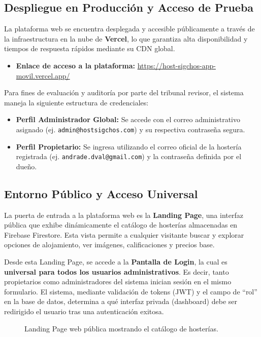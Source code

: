 \documentclass[12pt,letterpaper]{report}
\begin{document}
\subsection{Despliegue en Producción y Acceso de Prueba}
La plataforma web se encuentra desplegada y accesible públicamente a través de la infraestructura en la nube de \textbf{Vercel}, lo que garantiza alta disponibilidad y tiempos de respuesta rápidos mediante su CDN global.

\begin{itemize}
  \item \textbf{Enlace de acceso a la plataforma:} \url{https://host-sigchos-app-movil.vercel.app/}
\end{itemize}

Para fines de evaluación y auditoría por parte del tribunal revisor, el sistema maneja la siguiente estructura de credenciales:
\begin{itemize}
  \item \textbf{Perfil Administrador Global:} Se accede con el correo administrativo asignado (ej. \texttt{admin@hostsigchos.com}) y su respectiva contraseña segura.
  \item \textbf{Perfil Propietario:} Se ingresa utilizando el correo oficial de la hostería registrada (ej. \texttt{andrade.dval@gmail.com}) y la contraseña definida por el dueño.
\end{itemize}

\subsection{Entorno Público y Acceso Universal}
La puerta de entrada a la plataforma web es la \textbf{Landing Page}, una interfaz pública que exhibe dinámicamente el catálogo de hosterías almacenadas en Firebase Firestore. Esta vista permite a cualquier visitante buscar y explorar opciones de alojamiento, ver imágenes, calificaciones y precios base.

Desde esta Landing Page, se accede a la \textbf{Pantalla de Login}, la cual es \textbf{universal para todos los usuarios administrativos}. Es decir, tanto propietarios como administradores del sistema inician sesión en el mismo formulario. El sistema, mediante validación de tokens (JWT) y el campo de ``rol'' en la base de datos, determina a qué interfaz privada (dashboard) debe ser redirigido el usuario tras una autenticación exitosa.

\begin{figure}[H]
  \centering
  \caption{Landing Page web pública mostrando el catálogo de hosterías.}
\end{figure}
\end{document}

